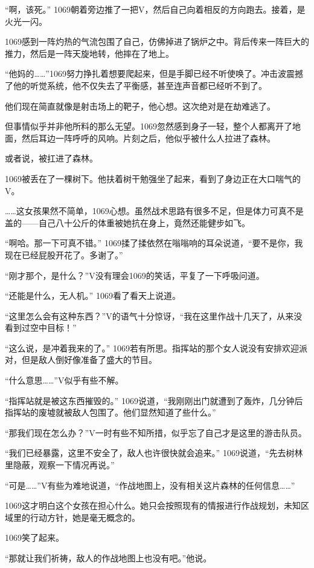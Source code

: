 “啊，该死。” 1069朝着旁边推了一把V，然后自己向着相反的方向跑去。接着，是火光一闪。

1069感到一阵灼热的气流包围了自己，仿佛掉进了锅炉之中。背后传来一阵巨大的推力，然后是一阵天旋地转，他摔在了地上。

“他妈的……”1069努力挣扎着想要爬起来，但是手脚已经不听使唤了。冲击波震撼了他的听觉系统，他不仅失去了平衡感，甚至连声音都已经听不到了。

他们现在简直就像是射击场上的靶子，他心想。这次绝对是在劫难逃了。

但事情似乎并非他所料的那么无望。1069忽然感到身子一轻，整个人都离开了地面，然后耳边一阵呼呼的风响。片刻之后，他似乎被什么人拉进了森林。

或者说，被扛进了森林。

1069被丢在了一棵树下。他扶着树干勉强坐了起来，看到了身边正在大口喘气的V。

……这女孩果然不简单，1069心想。虽然战术思路有很多不足，但是体力可真不是盖的——自己八十公斤的体重被她抗在身上，竟然还能健步如飞。

“啊哈。那一下可真不错。” 1069揉了揉依然在嗡嗡响的耳朵说道，“要不是你，我现在已经屁股开花了。多谢了。”

“刚才那个，是什么？”V没有理会1069的笑话，平复了一下呼吸问道。

“还能是什么，无人机。” 1069看了看天上说道。

“这里怎么会有这种东西？”V的语气十分惊讶，“我在这里作战十几天了，从来没看到过空中目标！”

“这么说，是冲着我来的了。” 1069若有所思。指挥站的那个女人说没有安排欢迎派对，但是敌人倒好像准备了盛大的节目。

“什么意思……”V似乎有些不解。

“指挥站就是被这东西摧毁的。” 1069说道，“我刚刚出门就遭到了轰炸，几分钟后指挥站的废墟就被敌人包围了。他们显然知道了些什么。”

“那我们现在怎么办？”V一时有些不知所措，似乎忘了自己才是这里的游击队员。

“我们已经暴露，这里不安全了，敌人也许很快就会追来。” 1069说道，“先去树林里隐蔽，观察一下情况再说。”

“可是……”V有些为难地说道，“作战地图上，没有相关这片森林的任何信息……”

1069这才明白这个女孩在担心什么。她只会按照现有的情报进行作战规划，未知区域里的行动方针，她是毫无概念的。

1069笑了起来。

“那就让我们祈祷，敌人的作战地图上也没有吧。”他说。

\section*{}

